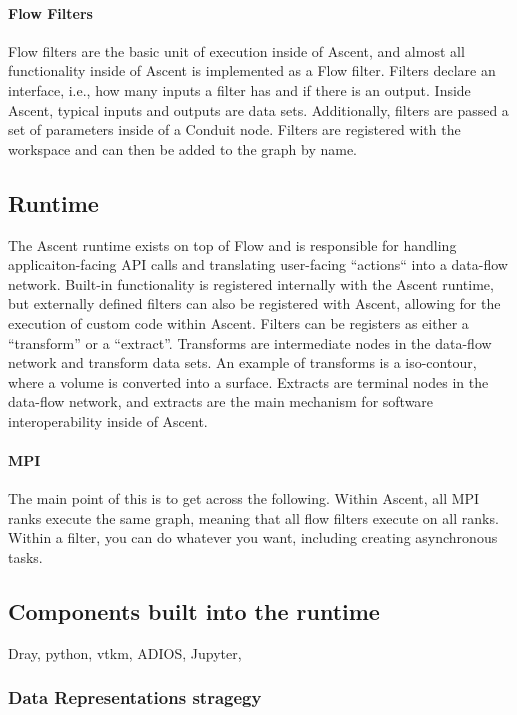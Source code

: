\paragraph{Flow Filters}
Flow filters are the basic unit of execution inside of Ascent, and
almost all functionality inside of Ascent is implemented as a Flow filter.
%
Filters declare an interface, i.e., how many inputs a filter has and
if there is an output.
%
Inside Ascent, typical inputs and outputs are data sets.
%
Additionally, filters are passed a set of parameters inside of a Conduit
node.
%
Filters are registered with the workspace and can then be added to the
graph by name.


\subsection{Runtime}
The Ascent runtime exists on top of Flow and is responsible for
handling applicaiton-facing API calls and translating user-facing
``actions`` into a data-flow network.
%
Built-in functionality is registered internally with the Ascent runtime,
but externally defined filters can also be registered with Ascent,
allowing for the execution of custom code within Ascent.
%
Filters can be registers as either a ``transform'' or a ``extract''.
%
Transforms are intermediate nodes in the data-flow network and transform
data sets.
%
An example of transforms is a iso-contour, where a volume is converted
into a surface.
%
Extracts are terminal nodes in the data-flow network, and extracts
are the main mechanism for software interoperability inside of Ascent.

\paragraph{MPI}
The main point of this is to get across the following.
Within Ascent, all MPI ranks execute the same graph, meaning
that all flow filters execute on all ranks.
%
Within a filter, you can do whatever you want, including creating asynchronous
tasks.

\subsection{Components built into the runtime}
Dray, python, vtkm, ADIOS, Jupyter,

\subsubsection{Data Representations stragegy}

